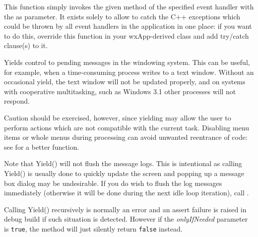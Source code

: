 
This function simply invokes the given method  of the specified
event handler  with the  as parameter. It exists solely
to allow to catch the C++ exceptions which could be thrown by all event
handlers in the application in one place: if you want to do this, override this
function in your wxApp-derived class and add try/catch clause(s) to it.


\label{wxappyield}


Yields control to pending messages in the windowing system. This can be useful, for example, when a
time-consuming process writes to a text window. Without an occasional
yield, the text window will not be updated properly, and on systems with
cooperative multitasking, such as Windows 3.1 other processes will not respond.

Caution should be exercised, however, since yielding may allow the
user to perform actions which are not compatible with the current task.
Disabling menu items or whole menus during processing can avoid unwanted
reentrance of code: see  for a better
function.

Note that Yield() will not flush the message logs. This is intentional as
calling Yield() is usually done to quickly update the screen and popping up a
message box dialog may be undesirable. If you do wish to flush the log
messages immediately (otherwise it will be done during the next idle loop
iteration), call .

Calling Yield() recursively is normally an error and an assert failure is
raised in debug build if such situation is detected. However if the 
{\it onlyIfNeeded} parameter is {\tt true}, the method will just silently
return {\tt false} instead.

